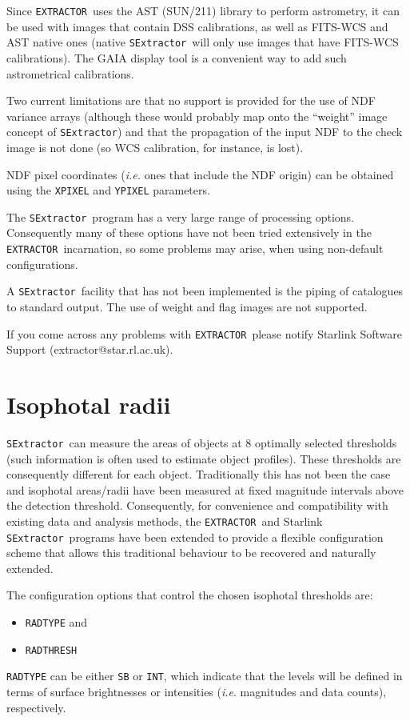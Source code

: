 \documentclass[twoside,11pt]{article}
\newcommand{\htmladdnormallink}[2]{#1}
\newcommand{\xref}[3]{#1}
\renewcommand{\_}{\texttt{\symbol{95}}}
\newcommand{\EXTRACTOR}{\texttt{EXTRACTOR}}
\newcommand{\SExtractor}{\texttt{SExtractor}}
\begin{document}
Since \EXTRACTOR\ uses the AST (\xref{SUN/211}{sun211}{}) library to
perform astrometry, it can be used with images that contain DSS
calibrations, as well as FITS-WCS and AST native ones (native
\SExtractor\ will only use images that have FITS-WCS
calibrations). The GAIA display tool is a convenient way to add such
astrometrical calibrations.

Two current limitations are that no support is provided for the use of
NDF variance arrays (although these would probably map onto the
``weight'' image concept of \SExtractor) and that the propagation of
the input NDF to the check image is not done (so WCS calibration, for
instance, is lost).

NDF pixel coordinates (\textit{i.e.} ones that include the NDF origin)
can be obtained using the \texttt{X\_PIXEL} and \texttt{Y\_PIXEL}
parameters.

The \SExtractor\ program has a very large range of processing
options. Consequently many of these options have not been tried
extensively in the \EXTRACTOR\ incarnation, so some problems may
arise, when using non-default configurations.

A \SExtractor\ facility that has not been implemented is the piping of
catalogues to standard output.  The use of weight and flag images are
not supported.

If you come across any problems with \EXTRACTOR\ please notify
Starlink Software Support
(\htmladdnormallink{extractor@star.rl.ac.uk}{mailto:extractor@star.rl.ac.uk}).

\section{Isophotal radii}

\SExtractor\ can measure the areas of objects at $8$ optimally selected
thresholds (such information is often used to estimate object
profiles). These thresholds are consequently different for each
object. Traditionally this has not been the case and isophotal
areas/radii have been measured at fixed magnitude intervals above the
detection threshold. Consequently, for convenience and compatibility
with existing data and analysis methods, the \EXTRACTOR\ and Starlink
\SExtractor\ programs have been extended to provide a flexible
configuration scheme that allows this traditional behaviour to be
recovered and naturally extended.

The configuration options that control the chosen isophotal thresholds
are:
\begin{itemize}
  \item \texttt{RAD\_TYPE} and
  \item \texttt{RAD\_THRESH}
\end{itemize}
\texttt{RAD\_TYPE} can be either \texttt{SB} or \texttt{INT},
which indicate that the levels will be defined in terms of surface
brightnesses or intensities (\textit{i.e}. magnitudes and data counts),
respectively.
\end{document}
